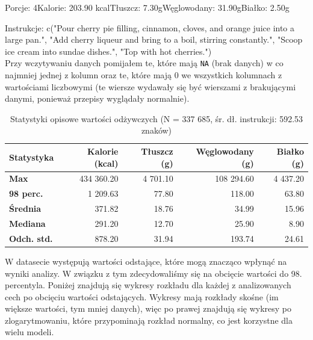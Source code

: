 \documentclass[12pt,a4paper]{article}
\begin{document}
\begingroup
\small\ttfamily\noindent
Porcje: 4\quad Kalorie: 203.90 kcal\quad Tłuszcz: 7.30g\quad Węglowodany: 31.90g\quad Białko: 2.50g

\medskip
\noindent
Instrukcje: c("Pour cherry pie filling, cinnamon, cloves, and orange juice into a large pan.", "Add cherry liqueur and bring to a boil, stirring constantly.", "Scoop ice cream into sundae dishes.", "Top with hot cherries.")
\endgroup \\

\noindent Przy wczytywaniu danych pomijałem te, które mają \texttt{NA} (brak danych) w co najmniej jednej z kolumn oraz te, które mają 0 we wszystkich kolumnach z wartościami liczbowymi (te wiersze wydawały się być wierszami z brakującymi danymi, ponieważ przepisy wyglądały normalnie).\\

\begin{table}[htbp]
    \centering
    \renewcommand{\arraystretch}{1.2}
    \begin{tabular}{|l|r|r|r|r|}
        \hline
        \textbf{Statystyka} & \textbf{Kalorie (kcal)} & \textbf{Tłuszcz (g)} & \textbf{Węglowodany (g)} & \textbf{Białko (g)} \\ \hline
        \textbf{Max} & 434 360.20 & 4 701.10 & 108 294.60 & 4 437.20 \\ \hline
        \textbf{98 perc.} & 1 209.63 & 77.80 & 118.00 & 63.80 \\ \hline
        \textbf{Średnia} & 371.82 & 18.76 & 34.99 & 15.96 \\ \hline
        \textbf{Mediana} & 291.20 & 12.70 & 25.90 & 8.90 \\ \hline
        \textbf{Odch. std.} & 878.20 & 31.94 & 193.74 & 24.61 \\ \hline
    \end{tabular}
    \caption{Statystyki opisowe wartości odżywczych (N = 337 685, śr. dł. instrukcji: 592.53 znaków)}
    \label{tab:statystyki_odzywcze_pion}
\end{table}

\noindent W datasecie występują wartości odstające, które mogą znacząco wpłynąć na wyniki analizy. W związku z tym zdecydowaliśmy się na obcięcie wartości do 98. percentyla. Poniżej znajdują się wykresy rozkładu dla każdej z analizowanych cech po obcięciu wartości odstających. Wykresy mają rozkłady skośne (im większe wartości, tym mniej danych), więc po prawej znajdują się wykresy po zlogarytmowaniu, które przypominają rozkład normalny, co jest korzystne dla wielu modeli.
\end{document}
